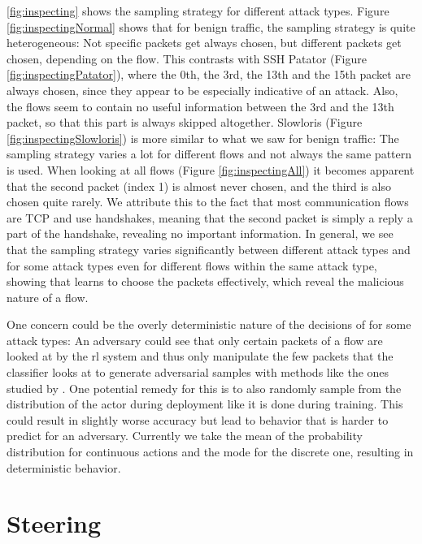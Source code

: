 \documentclass[conference]{IEEEtran}
\begin{document}

\autoref{fig:inspecting} shows the sampling strategy for different attack types. Figure \ref{fig:inspectingNormal} shows that for benign traffic, the sampling strategy is quite heterogeneous: Not specific packets get always chosen, but different packets get chosen, depending on the flow. This contrasts with SSH Patator (Figure \ref{fig:inspectingPatator}), where the 0th, the 3rd, the 13th and the 15th packet are always chosen, since they appear to be especially indicative of an attack. Also, the flows seem to contain no useful information between the 3rd and the 13th packet, so that this part is always skipped altogether. Slowloris (Figure \ref{fig:inspectingSlowloris}) is more similar to what we saw for benign traffic: The sampling strategy varies a lot for different flows and not always the same pattern is used. When looking at all flows (Figure \ref{fig:inspectingAll}) it becomes apparent that the second packet (index 1) is almost never chosen, and the third is also chosen quite rarely. We attribute this to the fact that most communication flows are TCP and use handshakes, meaning that the second packet is simply a reply a part of the handshake, revealing no important information. In general, we see that the sampling strategy varies significantly between different attack types and for some attack types even for different flows within the same attack type, showing that \ours{} learns to choose the packets effectively, which reveal the malicious nature of a flow.

One concern could be the overly deterministic nature of the decisions of \ours{} for some attack types: An adversary could see that only certain packets of a flow are looked at by the \gls{rl} system and thus only manipulate the few packets that the classifier looks at to generate adversarial samples with methods like the ones studied by \cite{hartl_explainability_2020}. One potential remedy for this is to also randomly sample from the distribution of the actor during deployment like it is done during training. This could result in slightly worse accuracy but lead to behavior that is harder to predict for an adversary. Currently we take the mean of the probability distribution for continuous actions and the mode for the discrete one, resulting in deterministic behavior.

\section{Steering}
\end{document}
